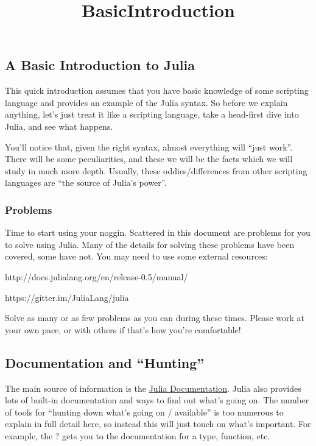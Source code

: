 \documentclass[11pt]{article}
\title{BasicIntroduction}
\begin{document}
    
    
    \maketitle
    
    

    
    \subsection{A Basic Introduction to
Julia}\label{a-basic-introduction-to-julia}

This quick introduction assumes that you have basic knowledge of some
scripting language and provides an example of the Julia syntax. So
before we explain anything, let's just treat it like a scripting
language, take a head-first dive into Julia, and see what happens.

You'll notice that, given the right syntax, almost everything will
``just work''. There will be some peculiarities, and these we will be
the facts which we will study in much more depth. Usually, these
oddies/differences from other scripting languages are ``the source of
Julia's power''.

    \subsubsection{Problems}\label{problems}

Time to start using your noggin. Scattered in this document are problems
for you to solve using Julia. Many of the details for solving these
problems have been covered, some have not. You may need to use some
external resources:

http://docs.julialang.org/en/release-0.5/manual/

https://gitter.im/JuliaLang/julia

Solve as many or as few problems as you can during these times. Please
work at your own pace, or with others if that's how you're comfortable!

    \subsection{Documentation and
``Hunting''}\label{documentation-and-hunting}

The main source of information is the
\href{http://docs.julialang.org/en/latest/manual/}{Julia Documentation}.
Julia also provides lots of built-in documentation and ways to find out
what's going on. The number of tools for ``hunting down what's going on
/ available'' is too numerous to explain in full detail here, so instead
this will just touch on what's important. For example, the ? gets you to
the documentation for a type, function, etc.
\end{document}
